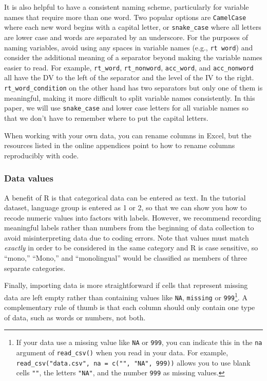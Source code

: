 \documentclass[
  english,
  doc,floatsintext]{apa6}
\begin{document}
It is also helpful to have a consistent naming scheme, particularly for variable names that require more than one word. Two popular options are \texttt{CamelCase} where each new word begins with a capital letter, or \texttt{snake\_case} where all letters are lower case and words are separated by an underscore. For the purposes of naming variables, avoid using any spaces in variable names (e.g., \texttt{rt\ word}) and consider the additional meaning of a separator beyond making the variable names easier to read. For example, \texttt{rt\_word}, \texttt{rt\_nonword}, \texttt{acc\_word}, and \texttt{acc\_nonword} all have the DV to the left of the separator and the level of the IV to the right. \texttt{rt\_word\_condition} on the other hand has two separators but only one of them is meaningful, making it more difficult to split variable names consistently. In this paper, we will use \texttt{snake\_case} and lower case letters for all variable names so that we don't have to remember where to put the capital letters.

When working with your own data, you can rename columns in Excel, but the resources listed in the online appendices point to how to rename columns reproducibly with code.

\hypertarget{data-values}{%
\subsubsection{Data values}\label{data-values}}

A benefit of R is that categorical data can be entered as text. In the tutorial dataset, language group is entered as 1 or 2, so that we can show you how to recode numeric values into factors with labels. However, we recommend recording meaningful labels rather than numbers from the beginning of data collection to avoid misinterpreting data due to coding errors. Note that values must match \emph{exactly} in order to be considered in the same category and R is case sensitive, so ``mono,'' ``Mono,'' and ``monolingual'' would be classified as members of three separate categories.

Finally, importing data is more straightforward if cells that represent missing data are left empty rather than containing values like \texttt{NA}, \texttt{missing} or \texttt{999}\footnote{If your data use a missing value like \texttt{NA} or \texttt{999}, you can indicate this in the \texttt{na} argument of \texttt{read\_csv()} when you read in your data. For example, \texttt{read\_csv("data.csv",\ na\ =\ c("",\ "NA",\ 999))} allows you to use blank cells \texttt{""}, the letters \texttt{"NA"}, and the number \texttt{999} as missing values.}. A complementary rule of thumb is that each column should only contain one type of data, such as words or numbers, not both.
\end{document}

